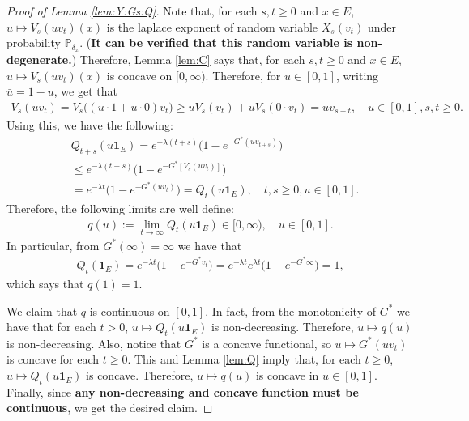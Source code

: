\documentclass[12pt,a4paper]{amsart}
\numberwithin{equation}{section}
\theoremstyle{plain}
\theoremstyle{definition}
\begin{document}
\begin{proof}[Proof of Lemma \ref{lem:Y:Gs:Q}]
Note that, for each $s,t\geq 0$ and $x\in E$, $u\mapsto V_s(uv_t)(x)$ is the laplace exponent of random variable $X_s(v_t)$ under probability $\mathbb P_{\delta_x}$.
({\bf It can be verified that this random variable is non-degenerate.})
Therefore, Lemma \ref{lem:C} says that, for each $s,t\geq 0$ and $x\in E$, $u\mapsto V_s(uv_t)(x)$ is concave on $[0,\infty)$. 
Therefore, for $u\in [0,1]$, writing $\bar u = 1- u$, we get that
\begin{align}
	V_s(uv_t)
  =V_s\big((u\cdot 1 + \bar u \cdot 0)v_t\big) 
  \geq uV_s(v_t) + \bar u V_s(0\cdot v_t) 
  = uv_{s+t},
  \quad u\in [0,1], s,t\geq 0.
\end{align} 
Using this, we have the following: 
\begin{align}
  & Q_{t+s}(u\mathbf 1_E) 
    = e^{- \lambda (t+s)} \big( 1-e^{-G^*(uv_{t+s})} \big) \\
  &  \leq e^{- \lambda(t+s)}\big( 1-e^{-G^*[V_s(uv_t)]} \big) \\
  & = e^{-\lambda t}\big( 1-e^{-G^*(uv_t)} \big)
    = Q_t(u\mathbf 1_E)
  , \quad t,s\geq 0, u \in [0,1].
\end{align}
Therefore, the following limits are well define:
\begin{align}
\label{eq:Y:Gs:Q:1}
	q(u)
  := \lim_{t\to \infty} Q_{t}(u \mathbf 1_E) \in [0,\infty),
  \quad u \in [0,1].
\end{align}
In particular, from $G^*(\infty) = \infty$ we have that
\begin{align}
	Q_t(\mathbf 1_E) = e^{- \lambda t} \big( 1-e^{-G^*v_t} \big)
  = e^{- \lambda t} e^{\lambda t}\big( 1-e^{-G^*\infty} \big)
  = 1,
\end{align}
which says that $q(1) = 1$.

We claim that $q$ is continuous on $[0,1]$.
In fact, from the monotonicity of $G^*$ we have that for each $t>0$, $u \mapsto Q_t(u \mathbf 1_E)$ is non-decreasing. 
Therefore, $u \mapsto q(u)$ is non-decreasing.
Also, notice that $G^*$ is a concave functional, so $u \mapsto G^*(u v_t)$ is concave for each $t\geq 0$. 
This and Lemma \ref{lem:Q} imply that, for each $t\geq 0$, $u \mapsto Q_t(u \mathbf 1_E)$ is concave.
Therefore, $u \mapsto q(u)$ is concave in $u\in [0,1]$.
Finally, since {\bf any non-decreasing and concave function must be continuous}, we get the desired claim.


\end{proof}
\end{document}
